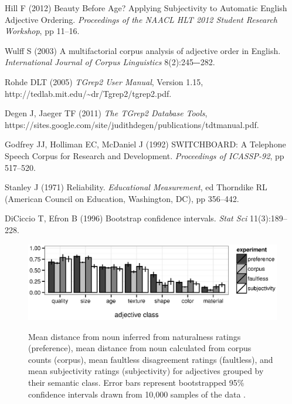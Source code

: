 \documentclass{pnastwo}
\begin{document}
\begin{article}
\begin{thebibliography}{10}
	Hill F (2012) Beauty Before Age? Applying Subjectivity to Automatic English Adjective Ordering. \emph{Proceedings of the NAACL HLT 2012 Student Research Workshop}, pp 11--16.	
		
	Wulff S (2003) A multifactorial corpus analysis of adjective order in English. \emph{International Journal of Corpus Linguistics} 8(2):245‒-282.
	
	Rohde DLT (2005) \emph{TGrep2 User Manual}, Version 1.15,\\ http://tedlab.mit.edu/\textasciitilde dr/Tgrep2/tgrep2.pdf.
	
	Degen J, Jaeger TF (2011) \emph{The TGrep2 Database Tools},\\ https://sites.google.com/site/judithdegen/publications/tdt\textunderscore manual.pdf.
	
	Godfrey JJ, Holliman EC, McDaniel J (1992) SWITCHBOARD: A Telephone Speech Corpus for Research and Development. \emph{Proceedings of ICASSP-92},
	pp 517--520.
	
	Stanley J (1971) Reliability. \emph{Educational Measurement}, ed Thorndike RL (American Council on Education, Washington, DC), pp 356--442.	
	
	DiCiccio T, Efron B (1996) Bootstrap confidence intervals. \emph{Stat Sci} 11(3):189--228.
	
\end{thebibliography}


\end{article}

\begin{figure}
	\centering
	{\includegraphics[width=.75\linewidth]{plots/expt_results-new.eps}}\par
	\caption{Mean distance from noun inferred from naturalness ratings (preference), mean distance from noun calculated from corpus counts (corpus),  mean faultless disagreement ratings (faultless), and mean subjectivity ratings (subjectivity) for adjectives grouped by their semantic class. Error bars represent bootstrapped 95\% confidence intervals drawn from 10,000 samples of the data \cite{diciccioefron1996}.}\label{results}
\end{figure}
\end{document}
